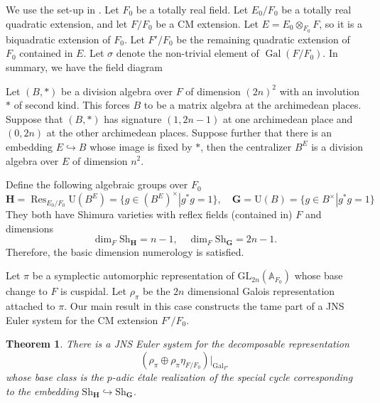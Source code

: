 \documentclass{amsart}
\newtheorem{theorem}{Theorem}[section]
\theoremstyle{definition}
\theoremstyle{remark}
\newcommand{\1}{\mathbf{1}}
\newcommand{\A}{\mathbb{A}}
\newcommand{\GL}{\mathrm{GL}}
\newcommand{\mb}[1]{\mathbf{#1}}
\newcommand{\U}{\mathrm{U}}
\DeclareMathOperator{\Gal}{Gal}
\DeclareMathOperator{\Res}{Res}
\theoremstyle{definition}
\newcommand{\bH}{\mathbf{H}}
\newcommand{\bG}{\mathbf{G}}
\newcommand{\Sh}{\mathrm{Sh}}
\begin{document}
We use the set-up in \cite{LXZ-TwistedFL}. Let $F_0$ be a totally real field. Let $E_0/F_0$ be a totally real quadratic extension, and let $F/F_0$ be a CM extension. Let $E=E_0\otimes_{F_0} F$, so it is a biquadratic extension of $F_0$. Let $F'/F_0$ be the remaining quadratic extension of $F_0$ contained in $E$. Let $\sigma$ denote the non-trivial element of $\Gal(F/F_0)$. In summary, we have the field diagram
\begin{center}
\end{center}

Let $(B,\ast)$ be a division algebra over $F$ of dimension $(2n)^2$ with an involution $\ast$ of second kind. This forces $B$ to be a matrix algebra at the archimedean places. Suppose that $(B,\ast)$ has signature $(1,2n-1)$ at one archimedean place and $(0,2n)$ at the other archimedean places. Suppose further that there is an embedding $E\hookrightarrow B$ whose image is fixed by $*$, then the centralizer $B^E$ is a division algebra over $E$ of dimension $n^2$.

Define the following algebraic groups over $F_0$
\[
    \bH=\Res_{E_0/F_0}\U(B^E)=\{g\in (B^E)^\times| g^*g=1\},\quad \bG=\U(B)=\{g\in B^\times|g^*g=1\}
\]
They both have Shimura varieties with reflex fields (contained in) $F$ and dimensions
\[
    \dim_F \Sh_{\mb{H}}=n-1,\quad \dim_F \Sh_{\mb{G}}=2n-1.
\]
Therefore, the basic dimension numerology is satisfied.

Let $\pi$ be a symplectic automorphic representation of $\GL_{2n}(\A_{F_0})$ whose base change to $F$ is cuspidal. Let $\rho_\pi$ be the $2n$ dimensional Galois representation attached to $\pi$. Our main result in this case constructs the tame part of a JNS Euler system for the CM extension $F'/F_0$.
\begin{theorem}\label{thm:TwistedFJ}
    There is a JNS Euler system for the decomposable representation
    \[
        (\rho_\pi\oplus\rho_\pi\eta_{F/F_0})|_{\Gal_{F'}}
    \]
    whose base class is the $p$-adic \'{e}tale realization of the special cycle corresponding to the embedding $\Sh_{\mb{H}}\hookrightarrow\Sh_{\mb{G}}$.
\end{theorem}
\end{document}
